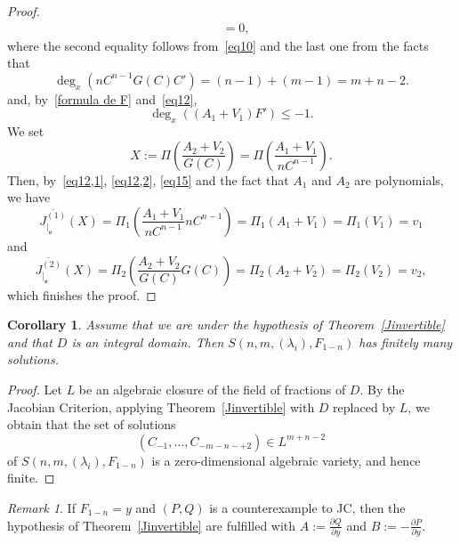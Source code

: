 \documentclass[reqno,a4paper]{amsart}
\newtheorem{corollary}[theorem]{Corollary}
\theoremstyle{definition}
\theoremstyle{remark}
\newtheorem{remark}[theorem]{Remark}
\newcommand{\ov}{\overline}
\begin{document}
\begin{proof}
\begin{align*}
%
&=0,
\end{align*}
where the second equality follows from~\eqref{eq10} and the last one from the facts that
$$
\deg_x(nC^{n-1}G(C)C')=(n-1)+(m-1)=m+n-2.
$$
and, by~\eqref{formula de F} and~\eqref{eq12},
$$
\deg_x((A_1+V_1)F')\le -1.
$$
We set
$$
X:=\Pi\left(\frac{A_2+V_2}{G(C)}\right)=\Pi\left(\frac{A_1+V_1}{nC^{n-1}}\right).
$$
Then, by~\eqref{eq12,1}, \eqref{eq12,2}, \eqref{eq15} and the fact that $A_1$ and $A_2$
are polynomials, we have
$$
\ov{J^{(1)}_{|_{\mathfrak{v}}}}(X)=\Pi_1\left(\frac{A_1+V_1}{nC^{n-1}}nC^{n-1}\right)=\Pi_1(A_1+V_1)=\Pi_1(V_1)=v_1
$$
and
$$
\ov{J^{(2)}_{|_{\mathfrak{v}}}}(X)=\Pi_2\left(\frac{A_2+V_2}{G(C)}G(C)\right)=\Pi_2(A_2+V_2)=\Pi_2(V_2)=v_2,
$$
which finishes the proof.
\end{proof}

\begin{corollary}\label{Jinvertiblecoro} Assume that we are under the hypothesis of
Theorem~\ref{Jinvertible} and that $D$ is an integral domain. Then $S(n,m,(\lambda_i),F_{1-n})$
has finitely many solutions.
\end{corollary}

\begin{proof} Let $L$ be an algebraic closure of the field of fractions of $D$. By the Jacobian Criterion,
applying Theorem~\ref{Jinvertible} with $D$ replaced by $L$, we obtain that the set of solutions
$$
(C_{-1},\dots,C_{-m-n-+2})\in L^{m+n-2}
$$
of $S(n,m,(\lambda_i),F_{1-n})$ is a zero-dimensional algebraic variety, and hence finite.
\end{proof}

\begin{remark} If $F_{1-n}=y$ and $(P,Q)$ is a counterexample to JC, then the hypothesis of
Theorem~\ref{Jinvertible} are fulfilled with $A:=\frac{\partial Q}{\partial y}$ and
$B:=-\frac{\partial P}{\partial y}$.
\end{remark}
\end{document}
